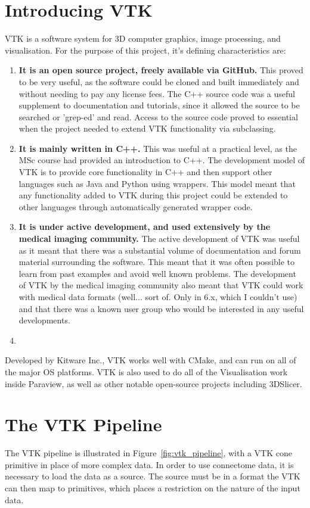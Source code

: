 \documentclass[MSc,paper=a4,pagesize=auto]{icldt}
\begin{document}
\section{Introducing VTK}
VTK is a software system for 3D computer graphics, image processing, and visualisation. For the purpose of this project, it's defining characteristics are:
\begin{enumerate}
\item \textbf{It is an open source project, freely available via GitHub.} This proved to be very useful, as the software could be cloned and built immediately and without needing to pay any license fees. The C++ source code was a useful supplement to documentation and tutorials, since it allowed the source to be searched or 'grep-ed' and read. Access to the source code proved to essential when the project needed to extend VTK functionality via subclassing. 
\item \textbf{It is mainly written in C++.} This was useful at a practical level, as the MSc course had provided an introduction to C++. The development model of VTK is to provide core functionality in C++ and then support other languages such as Java and Python using wrappers. This model meant that any functionality added to VTK during this project could be extended to other languages through automatically generated wrapper code.
\item \textbf{It is under active development, and used extensively by the medical imaging community.} The active development of VTK was useful as it meant that there was a substantial volume of documentation and forum material surrounding the software. This meant that it was often possible to learn from past examples and avoid well known problems. The development of VTK by the medical imaging community also meant that VTK could work with medical data formats (well... sort of. Only in 6.x, which I couldn't use) and that there was a known user group who would be interested in any useful developments.
\item 
\end{enumerate}

Developed by Kitware Inc., VTK works well with CMake, and can run on all of the major OS platforms. VTK is also used to do all of the Visualisation work inside Paraview, as well as other notable open-source projects including 3DSlicer.

\section{The VTK Pipeline}
The VTK pipeline is illustrated in Figure~\ref{fig:vtk_pipeline}, with a VTK cone primitive in place of more complex data. In order to use connectome data, it is necessary to load the data as a source. The source must be in a format the VTK can then map to primitives, which places a restriction on the nature of the input data.
\end{document}
